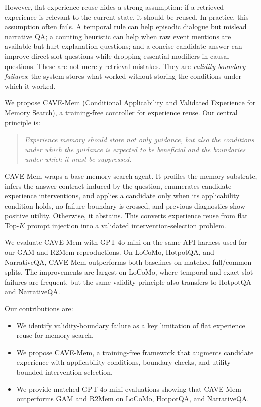 \documentclass[conference]{IEEEtran}
\newcommand{\method}{CAVE-Mem}
\begin{document}
However, flat experience reuse hides a strong assumption: if a retrieved
experience is relevant to the current state, it should be reused. In practice,
this assumption often fails. A temporal rule can help episodic dialogue but
mislead narrative QA; a counting heuristic can help when raw event mentions are
available but hurt explanation questions; and a concise candidate answer can
improve direct slot questions while dropping essential modifiers in causal
questions. These are not merely retrieval mistakes. They are
\emph{validity-boundary failures}: the system stores what worked without
storing the conditions under which it worked.

We propose \method{} (Conditional Applicability and Validated Experience for
Memory Search), a training-free controller for experience reuse. Our central
principle is:

\begin{quote}
\emph{Experience memory should store not only guidance, but also the
conditions under which the guidance is expected to be beneficial and the
boundaries under which it must be suppressed.}
\end{quote}

\method{} wraps a base memory-search agent. It profiles the memory substrate,
infers the answer contract induced by the question, enumerates candidate
experience interventions, and applies a candidate only when its applicability
condition holds, no failure boundary is crossed, and previous diagnostics show
positive utility. Otherwise, it abstains. This converts experience reuse from
flat Top-$K$ prompt injection into a validated intervention-selection problem.

We evaluate \method{} with GPT-4o-mini on the same API harness used for our GAM
and R2Mem reproductions. On LoCoMo, HotpotQA, and NarrativeQA, \method{}
outperforms both baselines on matched full/common splits. The improvements are
largest on LoCoMo, where temporal and exact-slot failures are frequent, but the
same validity principle also transfers to HotpotQA and NarrativeQA.

Our contributions are:
\begin{itemize}
    \item We identify validity-boundary failure as a key limitation of flat
    experience reuse for memory search.
    \item We propose \method{}, a training-free framework that augments
    candidate experience with applicability conditions, boundary checks, and
    utility-bounded intervention selection.
    \item We provide matched GPT-4o-mini evaluations showing that \method{}
    outperforms GAM and R2Mem on LoCoMo, HotpotQA, and NarrativeQA.
\end{itemize}
\end{document}
